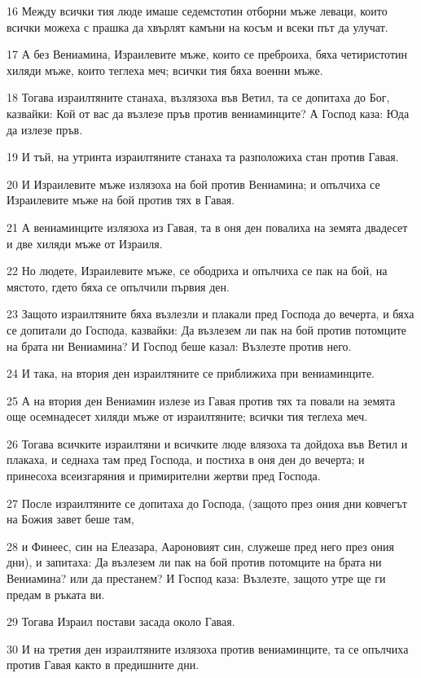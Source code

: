 \par 16 Между всички тия люде имаше седемстотин отборни мъже леваци, които всички можеха с прашка да хвърлят камъни на косъм и всеки път да улучат.
\par 17 А без Вениамина, Израилевите мъже, които се преброиха, бяха четиристотин хиляди мъже, които теглеха меч; всички тия бяха военни мъже.
\par 18 Тогава израилтяните станаха, възлязоха във Ветил, та се допитаха до Бог, казвайки: Кой от вас да възлезе пръв против вениаминците? А Господ каза: Юда да излезе пръв.
\par 19 И тъй, на утринта израилтяните станаха та разположиха стан против Гавая.
\par 20 И Израилевите мъже излязоха на бой против Вениамина; и опълчиха се Израилевите мъже на бой против тях в Гавая.
\par 21 А вениаминците излязоха из Гавая, та в оня ден повалиха на земята двадесет и две хиляди мъже от Израиля.
\par 22 Но людете, Израилевите мъже, се ободриха и опълчиха се пак на бой, на мястото, гдето бяха се опълчили първия ден.
\par 23 Защото израилтяните бяха възлезли и плакали пред Господа до вечерта, и бяха се допитали до Господа, казвайки: Да възлезем ли пак на бой против потомците на брата ни Вениамина? И Господ беше казал: Възлезте против него.
\par 24 И така, на втория ден израилтяните се приближиха при вениаминците.
\par 25 А на втория ден Вениамин излезе из Гавая против тях та повали на земята още осемнадесет хиляди мъже от израилтяните; всички тия теглеха меч.
\par 26 Тогава всичките израилтяни и всичките люде влязоха та дойдоха във Ветил и плакаха, и седнаха там пред Господа, и постиха в оня ден до вечерта; и принесоха всеизгаряния и примирителни жертви пред Господа.
\par 27 После израилтяните се допитаха до Господа, (защото през ония дни ковчегът на Божия завет беше там,
\par 28 и Финеес, син на Елеазара, Аароновият син, служеше пред него през ония дни), и запитаха: Да възлезем ли пак на бой против потомците на брата ни Вениамина? или да престанем? И Господ каза: Възлезте, защото утре ще ги предам в ръката ви.
\par 29 Тогава Израил постави засада около Гавая.
\par 30 И на третия ден израилтяните излязоха против вениаминците, та се опълчиха против Гавая както в предишните дни.
